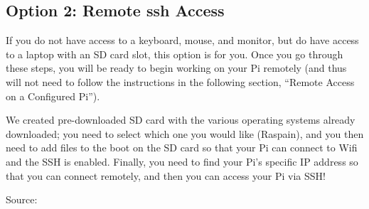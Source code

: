 \documentclass{article}\usepackage[]{graphicx}\usepackage[]{color}
\begin{document}
\subsection{Option 2: Remote ssh Access}\label{subsec:Option2}

If you do not have access to a keyboard, mouse, and monitor, but do have access to a laptop with an SD card slot, this option is for you.  Once you go through these steps, you will be ready to begin working on your Pi remotely (and thus will not need to follow the instructions in the following section, ``Remote Access on a Configured Pi'').

We created pre-downloaded SD card with the various operating systems already downloaded; you need to select which one you would like (Raspain), and you then need to add files to the boot on the SD card so that your Pi can connect to Wifi and the SSH is enabled.  Finally, you need to find your Pi's specific IP address so that you can connect remotely, and then you can access your Pi via SSH!

Source: %
\end{document}
